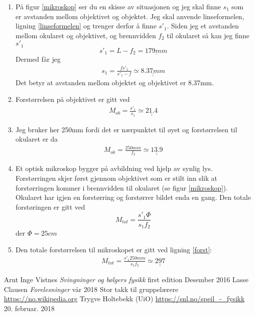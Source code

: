 \documentclass[a4paper,12pt,norsk]{article}
\newcommand{\uu}{\underline}
\begin{document}
\begin{enumerate}[label=(\alph*)]
\item
På figur \vref{mikroskop} ser du en skisse av situasjonen og jeg skal finne $s_1$ som er avstanden mellom objektivet og objektet. Jeg skal anvende linseformelen, ligning \vref{linseformelen} og trenger derfor å finne $s'_1$. Siden jeg et avstanden mellom okularet og objektivet, og brennvidden $f_2$ til okularet så kan jeg finne $s'_1$
$$
s'_1 = L - f_2 = \uu{179mm}
$$
Dermed får jeg 
\begin{align*}
s_1 = \frac{f s'_1}{s'_1 - f} \simeq \uu{\uu{8.37mm}}
\end{align*}
Det betyr at avstanden mellom objektet og objektivet er 8.37mm.

\item
Forstørrelsen på objektivet er gitt ved
\begin{align*}
M_{ob} = \frac{s'_1}{s_1} \simeq \uu{\uu{21.4}} 
\end{align*}

\item
Jeg bruker her 250mm fordi det er nærpunktet til øyet og forstørrelsen til okularet er da
\begin{align*}
M_{ok} = \frac{250mm}{f_2} \simeq \uu{\uu{13.9}} 
\end{align*}

\item
Et optisk mikroskop bygger på avbildning ved hjelp av synlig lys. Forstørringen skjer først gjennom objektivet som er stilt inn slik at forstørringen kommer i brennvidden til okularet (se figur \vref{mikroskop}). Okularet har igjen en forstørring og forstørrer bildet enda en gang. Den totale forstøringen er gitt ved
\begin{equation}
M_{tot} = \frac{s'_1 \Phi}{s_1 f_2}
\label{forst}
\end{equation}
der $\Phi=25 cm$
\item
Den totale forstørrelsen til mikroskopet er gitt ved ligning \vref{forst}:
\begin{align*}
M_{tot} = \frac{s'_1 250mm}{s_1 f_2} \simeq \uu{\uu{297}} 
\end{align*}
\end{enumerate}



\begin{thebibliography}{}
	Arnt Inge Vistnes
	\textit{Svingninger og bølgers fysikk}
	first edition
	Desember 2016
	Lasse Clausen
	\textit{Forelesninger}
	vår 2018
	Stor takk til gruppelærere
	\url{https://no.wikipedia.org}
	Trygve Holtebekk (UiO)
	\url{https://snl.no/speil_-_fysikk}
	20. februar. 2018
\end{thebibliography}
\end{document}

